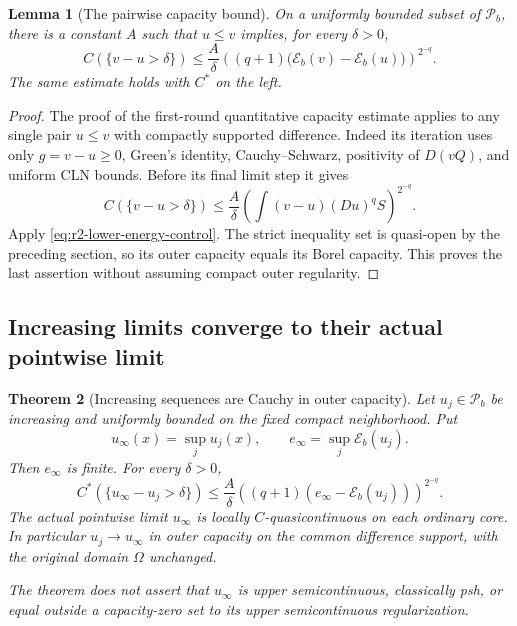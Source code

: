 \documentclass[11pt,a4paper]{article}
\numberwithin{equation}{section}
\newtheorem{theorem}{Theorem}[section]
\newtheorem{lemma}[theorem]{Lemma}
\theoremstyle{definition}
\theoremstyle{remark}
\begin{document}
\begin{lemma}[The pairwise capacity bound]
\label{lem:r2-pair-capacity}
On a uniformly bounded subset of $\mathcal P_b$, there is a constant
$A$ such that $u\leq v$ implies, for every $\delta>0$,
\begin{equation}
\label{eq:r2-pair-capacity}
 C(\{v-u>\delta\})
 \leq\frac A\delta
   \left((q+1)\bigl(\mathcal E_b(v)-\mathcal E_b(u)\bigr)
   \right)^{2^{-q}}.
\end{equation}
The same estimate holds with $C^*$ on the left.
\end{lemma}

\begin{proof}
The proof of the first-round quantitative capacity estimate applies
to any single pair $u\leq v$ with compactly supported difference.
Indeed its iteration uses only $g=v-u\geq0$, Green's identity,
Cauchy--Schwarz, positivity of $D(vQ)$, and uniform CLN bounds.
Before its final limit step it gives
\[
 C(\{v-u>\delta\})
 \leq\frac A\delta\left(\int(v-u)(Du)^qS\right)^{2^{-q}}.
\]
Apply \eqref{eq:r2-lower-energy-control}. The strict inequality set is
quasi-open by the preceding section, so its outer capacity equals its
Borel capacity. This proves the last assertion without assuming compact
outer regularity.
\end{proof}

\subsection{Increasing limits converge to their actual pointwise limit}

\begin{theorem}[Increasing sequences are Cauchy in outer capacity]
\label{thm:r2-increasing-cauchy}
Let $u_j\in\mathcal P_b$ be increasing and uniformly bounded on the
fixed compact neighborhood. Put
\[
 u_\infty(x)=\sup_j u_j(x),\qquad
 e_\infty=\sup_j\mathcal E_b(u_j).
\]
Then $e_\infty$ is finite. For every $\delta>0$,
\begin{equation}
\label{eq:r2-increasing-actual-rate}
 C^*(\{u_\infty-u_j>\delta\})
 \leq\frac A\delta
     \left((q+1)(e_\infty-\mathcal E_b(u_j))\right)^{2^{-q}}.
\end{equation}
The actual pointwise limit $u_\infty$ is locally
$C$-quasicontinuous on each ordinary core. In particular
$u_j\to u_\infty$ in outer capacity on the common difference support,
with the original domain $\Omega$ unchanged.

The theorem does not assert that $u_\infty$ is upper semicontinuous,
classically psh, or equal outside a capacity-zero set to its upper
semicontinuous regularization.
\end{theorem}
\end{document}
